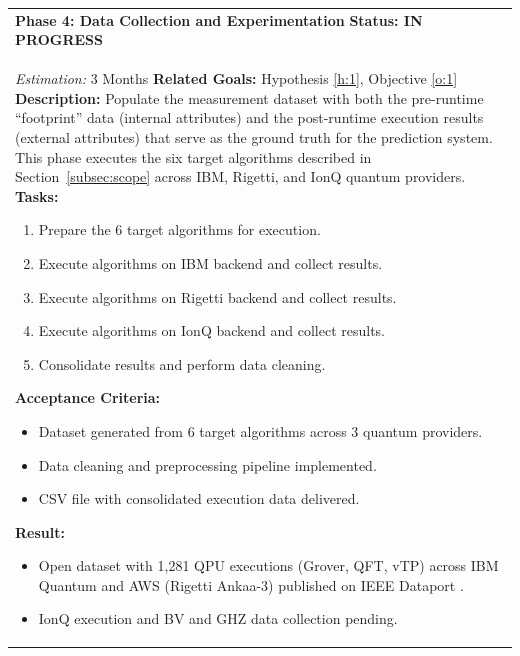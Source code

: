 \documentclass{article}
\begin{document}
\begin{longtable}{@{}p{\textwidth}@{}}
    \textbf{Phase 4: Data Collection and Experimentation} \label{p:4} \hfill \textbf{Status: IN PROGRESS} \\
    \textit{Estimation:} 3 Months \newline
    \textbf{Related Goals:} Hypothesis \ref{h:1}, Objective \ref{o:1} \newline
    \textbf{Description:} Populate the measurement dataset with both the pre-runtime ``footprint'' data (internal attributes) and the post-runtime execution results (external attributes) that serve as the ground truth for the prediction system. This phase executes the six target algorithms described in Section~\ref{subsec:scope} across IBM, Rigetti, and IonQ quantum providers. \newline
    \textbf{Tasks:}
    \begin{enumerate}[label=T4.\arabic*, ref=T4.\arabic*, font=\bfseries, leftmargin=3.5em, labelindent=0pt, itemindent=0pt, labelsep=0.5em, noitemsep, topsep=0pt]
        \item \label{p4:t1} Prepare the 6 target algorithms for execution.
        \item \label{p4:t2} Execute algorithms on IBM backend and collect results.
        \item \label{p4:t3} Execute algorithms on Rigetti backend and collect results.
        \item \label{p4:t4} Execute algorithms on IonQ backend and collect results.
        \item \label{p4:t5} Consolidate results and perform data cleaning.
    \end{enumerate}
    \textbf{Acceptance Criteria:}
    \begin{itemize}[leftmargin=1.5em, labelindent=0pt, itemindent=0pt, noitemsep, topsep=0pt]
        \item Dataset generated from 6 target algorithms across 3 quantum providers.
        \item Data cleaning and preprocessing pipeline implemented.
        \item CSV file with consolidated execution data delivered.
    \end{itemize}
    \textbf{Result:}
    \begin{itemize}[leftmargin=1.5em, labelindent=0pt, itemindent=0pt, noitemsep, topsep=0pt]
        \item Open dataset with 1,281 QPU executions (Grover, QFT, vTP) across IBM Quantum and AWS (Rigetti Ankaa-3) published on IEEE Dataport \cite{data_2}.
        \item IonQ execution and BV and GHZ data collection pending.
    \end{itemize} \\
    \midrule


\end{longtable}
\end{document}
